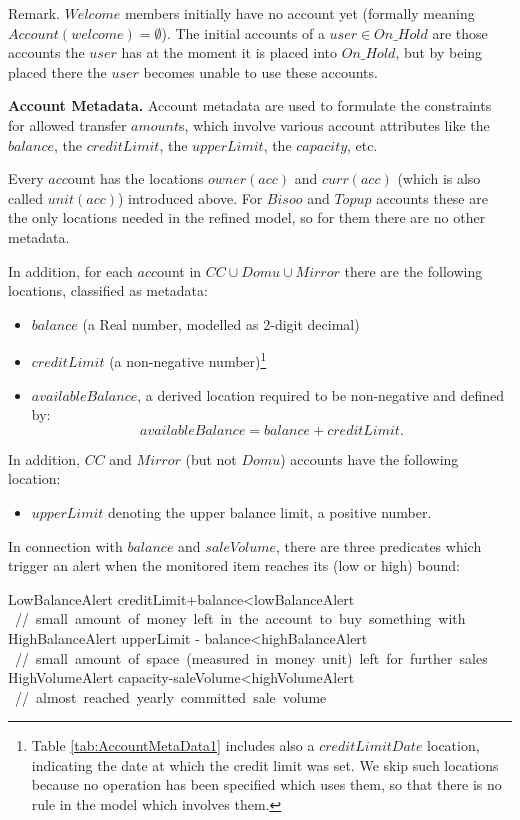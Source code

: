 Remark. $Welcome$ members initially have no account yet (formally meaning  $Account(welcome)=\emptyset$). The initial accounts of a 
$user \in On\_Hold$ are those accounts the $user$ has at the moment it is placed into $On\_Hold$, but by being placed there the $user$ becomes unable to use these accounts.

{\bf Account Metadata.} Account metadata are used to formulate the constraints for allowed transfer $amount$s, which involve various account attributes like the $balance$, the $creditLimit$, the $upperLimit$, the $capacity$, etc. 

Every $acc$ount has the locations $owner(acc)$ and $curr(acc)$ (which is also called $unit(acc)$) introduced above. For $Bisoo$ and $Topup$ accounts these are the only locations needed in the refined model, so for them there are no other metadata. 

In addition, for each $acc$ount in $CC \cup Domu \cup Mirror$ there are the following locations, classified as metadata:

\begin{itemize}
	\item $balance$ (a Real number, modelled as 2-digit decimal)
	
	\item $creditLimit$ (a non-negative number)\footnote{Table \ref{tab:AccountMetaData1} includes also a $creditLimitDate$ location, indicating the date at which the credit limit was set. We skip such locations because no operation has been specified which uses them, so that there is no rule in the model which involves them.}
	
	\item $availableBalance$, a derived location required to be non-negative and defined by:
	\[availableBalance=balance+creditLimit.\]
\end{itemize}

In addition, $CC$ and $Mirror$ (but not $Domu$) accounts have the following  location:
\begin{itemize}
\item $upperLimit$ denoting the upper balance limit, a positive number.
\end{itemize}
In connection with $balance$ and $saleVolume$, there are three predicates which trigger an alert when the monitored item reaches its (low or high) bound:
\begin{asm}
LowBalanceAlert \IFF creditLimit+balance<lowBalanceAlert \+
   \mbox{ // small amount of money left in the account to buy something with}\-
HighBalanceAlert \IFF upperLimit - balance<highBalanceAlert \+
        \mbox{ // small amount of space (measured in money unit) left for further sales}\-
HighVolumeAlert \IFF capacity-saleVolume<highVolumeAlert \+
           \mbox{ // almost reached yearly committed sale volume}
\end{asm}

